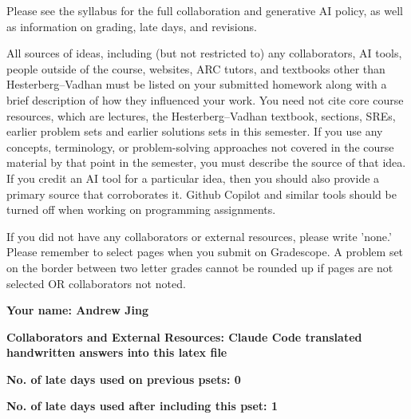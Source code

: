 \documentclass[11pt]{article}
\begin{document}

Please see the syllabus for the full collaboration and generative AI policy, as well as information on grading, late days, and revisions.

All sources of ideas, including (but not restricted to) any collaborators, AI tools, people outside of the course, websites, ARC tutors, and textbooks other than Hesterberg--Vadhan must be listed on your submitted homework along with a brief description of how they influenced your work. You need not cite core course resources, which are lectures, the Hesterberg--Vadhan textbook, sections, SREs, earlier problem sets and earlier solutions sets in this semester. If you use any concepts, terminology, or problem-solving approaches not covered in the course material by that point in the semester, you must describe the source of that idea. If you credit an AI tool for a particular idea, then you should also provide a primary source that corroborates it. Github Copilot and similar tools should be turned off when working on programming assignments.

If you did not have any collaborators or external resources, please write 'none.' Please remember to select pages when you submit on Gradescope. A problem set on the border between two letter grades cannot be rounded up if pages are not selected OR collaborators not noted.
\newline

\textbf{Your name: Andrew Jing}

\textbf{Collaborators and External Resources: Claude Code translated handwritten answers into this latex file}

\textbf{No. of late days used on previous psets: 0}

\textbf{No. of late days used after including this pset: 1}

\vspace{1em}

\newpage
\end{document}
